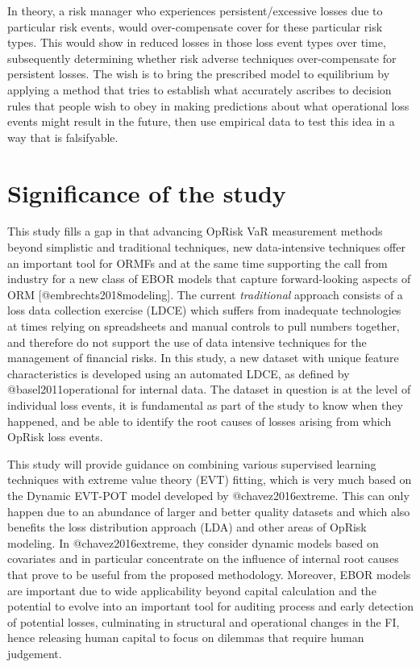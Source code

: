 \documentclass[
]{article}
\begin{document}
In theory, a risk manager who experiences persistent/excessive losses
due to particular risk events, would over-compensate cover for these
particular risk types. This would show in reduced losses in those loss
event types over time, subsequently determining whether risk adverse
techniques over-compensate for persistent losses. The wish is to bring
the prescribed model to equilibrium by applying a method that tries to
establish what accurately ascribes to decision rules that people wish to
obey in making predictions about what operational loss events might
result in the future, then use empirical data to test this idea in a way
that is falsifyable.

\section{Significance of the study}
\label{sec:Significance of the study}

This study fills a gap in that advancing OpRisk VaR measurement methods
beyond simplistic and traditional techniques, new data-intensive
techniques offer an important tool for ORMFs and at the same time
supporting the call from industry for a new class of EBOR models that
capture forward-looking aspects of ORM {[}@embrechts2018modeling{]}. The
current \emph{traditional} approach consists of a loss data collection
exercise (LDCE) which suffers from inadequate technologies at times
relying on spreadsheets and manual controls to pull numbers together,
and therefore do not support the use of data intensive techniques for
the management of financial risks. In this study, a new dataset with
unique feature characteristics is developed using an automated LDCE, as
defined by @basel2011operational for internal data. The dataset in
question is at the level of individual loss events, it is fundamental as
part of the study to know when they happened, and be able to identify
the root causes of losses arising from which OpRisk loss
events.\medskip 

This study will provide guidance on combining various supervised
learning techniques with extreme value theory (EVT) fitting, which is
very much based on the Dynamic EVT-POT model developed by
@chavez2016extreme. This can only happen due to an abundance of larger
and better quality datasets and which also benefits the loss
distribution approach (LDA) and other areas of OpRisk modeling. In
@chavez2016extreme, they consider dynamic models based on covariates and
in particular concentrate on the influence of internal root causes that
prove to be useful from the proposed methodology. Moreover, EBOR models
are important due to wide applicability beyond capital calculation and
the potential to evolve into an important tool for auditing process and
early detection of potential losses, culminating in structural and
operational changes in the FI, hence releasing human capital to focus on
dilemmas that require human judgement.
\end{document}
